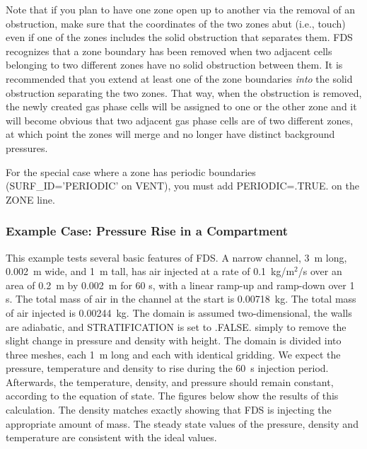 \documentclass[11pt]{book}
\begin{document}
Note that if you plan to have one zone open up to another via the removal of an obstruction, make sure that the coordinates of the two
zones abut (i.e., touch) even if one of the zones includes the solid obstruction that separates them. FDS recognizes that a zone boundary has been removed when
two adjacent cells belonging to two different zones have no solid obstruction between them. It is recommended that you extend at least one
of the zone boundaries {\em into} the solid obstruction separating the two zones. That way, when the obstruction is removed, the newly created
gas phase cells will be assigned to one or the other zone and it will become obvious that two adjacent gas phase cells are of two different zones, at
which point the zones will merge and no longer have distinct background pressures.

For the special case where a zone has periodic boundaries ({\ct SURF\_ID='PERIODIC'} on {\ct VENT}), you must add {\ct PERIODIC=.TRUE.} on the {\ct ZONE} line.


\subsubsection{Example Case: Pressure Rise in a Compartment}

This example tests several basic features of FDS. A narrow channel, 3~m long, 0.002~m wide, and 1~m tall, has air injected at a rate of
0.1~kg/m$^2$/s over an area of 0.2~m by 0.002~m for 60 s, with a linear ramp-up and ramp-down over 1 s. The total mass of air in the channel at the
start is 0.00718~kg. The total mass of air injected is 0.00244~kg. The domain is assumed two-dimensional, the walls are adiabatic, and {\ct
STRATIFICATION} is set to {\ct .FALSE.} simply to remove the slight change in pressure and density with height.
The domain is divided into three meshes, each 1~m long and each with identical gridding.  We expect the pressure,
temperature and density to rise during the 60~s injection period. Afterwards, the
temperature, density, and pressure should remain constant, according to the equation of state.
The figures below show the results of this calculation.  The density matches exactly showing
that FDS is injecting the appropriate amount of mass. The steady state values of the pressure, density and temperature are consistent with
the ideal values.
\end{document}
